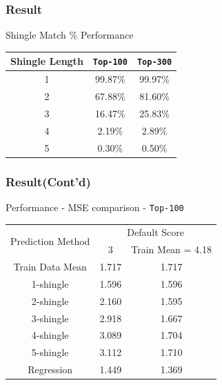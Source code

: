 \documentclass[11pt]{beamer}
\begin{document}
\begin{frame}
\frametitle{Result}

	\centering
	Shingle Match \% Performance

	\begin{center}
		\begin{tabular}{ccc}
			\toprule
				Shingle Length & \texttt{Top-100} & \texttt{Top-300} \\
			\midrule
				1 & 99.87\% & 99.97\% \\
				2 & 67.88\% & 81.60\% \\
				3 & 16.47\% & 25.83\% \\
				4 & 2.19\%  & 2.89\% \\
				5 & 0.30\%  & 0.50\% \\
			\bottomrule
		\end{tabular}
	\end{center}
	\vspace{5mm}




\end{frame}

\begin{frame}
\frametitle{Result(Cont'd)}

	\centering
	Performance - MSE comparison - \texttt{Top-100}

	\begin{center}

		\begin{tabular}{ccc}
			\toprule
				\multirow{2}{*}{Prediction Method} &
				\multicolumn{2}{c}{Default Score}\\
				\cline{2-3}
				& 3 & Train Mean = 4.18 \\
			\midrule
				Train Data Mean & 1.717 & 1.717 \\
				\hline
				1-shingle & 1.596 & 1.596\\
				2-shingle & 2.160 & 1.595\\
				3-shingle & 2.918 & 1.667\\
				4-shingle & 3.089 & 1.704\\
				5-shingle & 3.112 & 1.710\\
				\hline
				Regression & 1.449 & 1.369\\

			\bottomrule
		\end{tabular}
	\end{center}
	\vspace{5mm}

\end{frame}
\end{document}
